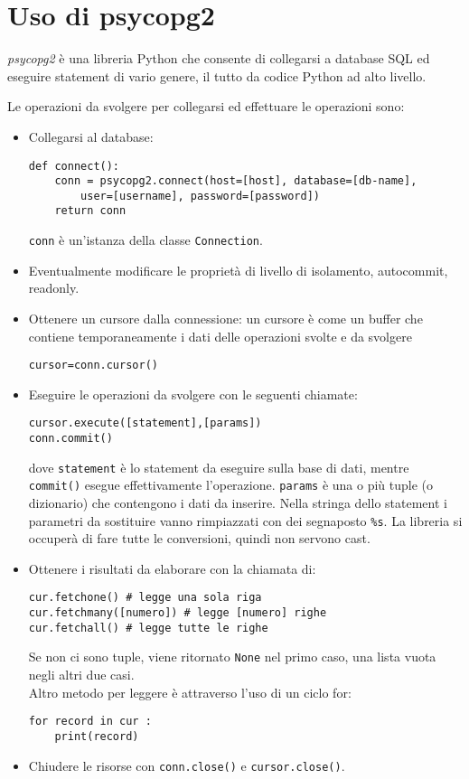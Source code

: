 \documentclass[a4paper, 10pt, titlepage]{article}
\begin{document}
	\newpage
	
	\section{Uso di psycopg2}
	\textit{psycopg2} è una libreria Python che consente di collegarsi a database SQL ed eseguire statement di vario genere, il tutto da codice Python ad alto livello.
	
	Le operazioni da svolgere per collegarsi ed effettuare le operazioni sono:
	\begin{itemize}
		\item Collegarsi al database:
		\begin{lstlisting}[frame=tb]
def connect():
	conn = psycopg2.connect(host=[host], database=[db-name],
		user=[username], password=[password])
	return conn
		\end{lstlisting}
		\lstinline|conn| è un'istanza della classe \lstinline|Connection|.
		
		\item Eventualmente modificare le proprietà di livello di isolamento, autocommit, readonly.
		\item Ottenere un cursore dalla connessione: un cursore è come un buffer che contiene temporaneamente i dati delle operazioni svolte e da svolgere
		\begin{lstlisting}[frame=tb]
cursor=conn.cursor()
		\end{lstlisting}
		
		\item Eseguire le operazioni da svolgere con le seguenti chiamate:
		\begin{lstlisting}[frame=tb]
cursor.execute([statement],[params])
conn.commit()
		\end{lstlisting}
		dove \lstinline|statement| è lo statement da eseguire sulla base di dati, mentre \lstinline|commit()| esegue effettivamente l'operazione. \lstinline|params| è una o più tuple (o dizionario) che contengono i dati da inserire. Nella stringa dello statement i parametri da sostituire vanno rimpiazzati con dei segnaposto \lstinline|%s|. La libreria si occuperà di fare tutte le conversioni, quindi non servono cast.
		
		\item Ottenere i risultati da elaborare con la chiamata di:
		\begin{lstlisting}[frame=tb]
cur.fetchone() # legge una sola riga
cur.fetchmany([numero]) # legge [numero] righe
cur.fetchall() # legge tutte le righe
		\end{lstlisting}
		Se non ci sono tuple, viene ritornato \lstinline|None| nel primo caso, una lista vuota negli altri due casi. \\
		Altro metodo per leggere è attraverso l'uso di un ciclo for:
		\begin{lstlisting}[frame=tb]
for record in cur :
	print(record)
		\end{lstlisting}
		
		\item Chiudere le risorse con \lstinline|conn.close()| e \lstinline|cursor.close()|.
	\end{itemize} \medskip
\end{document}
